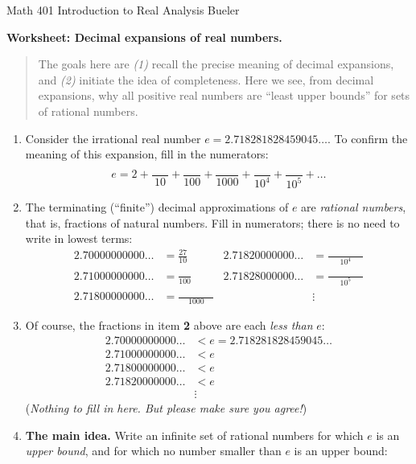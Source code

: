 \documentclass[11pt]{amsart}
\newcommand{\boxtop}[1]{\frac{\boxed{\phantom{foo}}}{#1}}
\newcommand{\wboxtop}[1]{\frac{\boxed{\phantom{foo foo foo}}}{#1}}
\begin{document}
\scriptsize \noindent Math 401 Introduction to Real Analysis \hfill Bueler
\normalsize\medskip

\Large\centerline{\textbf{Worksheet: Decimal expansions of real numbers.}}
\medskip
\normalsize

\thispagestyle{empty}

\begin{quote}
The goals here are \emph{(1)} recall the precise meaning of decimal expansions, and \emph{(2)} initiate the idea of completeness.  Here we see, from decimal expansions, why all positive real numbers are ``least upper bounds'' for sets of rational numbers.
\end{quote}

\bigskip
\begin{enumerate}[leftmargin=-1mm]
\renewcommand{\labelenumi}{\textbf{\arabic{enumi}.}}
\item Consider the irrational real number $e = 2.718281828459045\dots$.  To confirm the meaning of this expansion, fill in the numerators:
	$$e = 2 + \boxtop{10} + \boxtop{100} + \boxtop{1000} + \boxtop{10^4} + \boxtop{10^5} + \dots$$

\bigskip
\item The terminating (``finite'') decimal approximations of $e$ are \emph{rational numbers}, that is, fractions of natural numbers.  Fill in numerators; there is no need to write in lowest terms:
\begin{align*}
2.70000000000\dots &= \frac{27}{10}  & 2.71820000000\dots &= \wboxtop{10^4} \\
2.71000000000\dots &= \boxtop{100}   & 2.71828000000\dots &= \wboxtop{10^5} \\
2.71800000000\dots &= \wboxtop{1000} & &\vdots
\end{align*}
\bigskip
\item Of course, the fractions in item \textbf{2} above are each \emph{less than} $e$:
\begin{align*}
2.70000000000\dots &< e = 2.718281828459045\dots \\
2.71000000000\dots &< e \\
2.71800000000\dots &< e \\
2.71820000000\dots &< e \\
&\vdots
\end{align*}
(\emph{Nothing to fill in here.  But please make sure you agree!})

\medskip
\item \textbf{The main idea.}  Write an infinite set of rational numbers for which $e$ is an \emph{upper bound}, and for which no number smaller than $e$ is an upper bound:


\end{enumerate}
\end{document}
